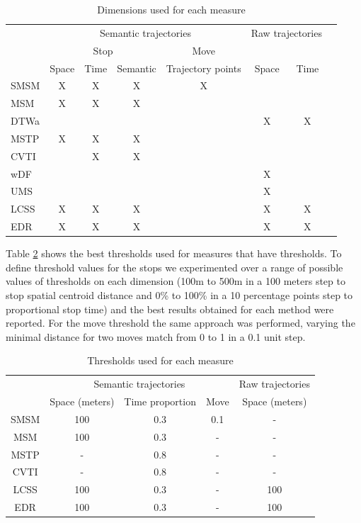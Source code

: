 \documentclass[12pt]{article}
\begin{document}
\begin{table}[!h]
\scriptsize
  \centering
  \begin{tabular}{|l|c|c|c|c|c|c|c|}
  	\hline
  & \multicolumn{4}{c|}{Semantic trajectories} & \multicolumn{2}{c|}{Raw trajectories} \\
 	\cline{2-5}
  & \multicolumn{3}{c|}{Stop} & \multicolumn{1}{c|}{Move} & \multicolumn{2}{c|}{} \\
 	\cline{2-7}
  & Space & Time & Semantic & Trajectory points & Space & Time\\
  	\hline
 SMSM & X & X & X & X & & \\
 MSM & X & X & X & & & \\
 DTWa &  &  &  & & X & X \\
 MSTP & X & X & X & & & \\
 CVTI & & X & X & & & \\
 wDF & & & & & X & \\
 UMS & & & & & X & \\
 LCSS & X & X & X & & X & X \\
 EDR & X & X & X & & X & X \\
    \hline
  \end{tabular}
  \caption{Dimensions used for each measure}
  \label{tab:san_francisco_measures}
\end{table}

Table \ref{tab:san_francisco_thresholds} shows the best thresholds used for measures that have thresholds. To define threshold values for the stops we experimented over a range of possible values of thresholds on each dimension (100m to 500m in a 100 meters step to stop spatial centroid distance and 0\% to 100\% in a 10 percentage points step to proportional stop time) and the best results obtained for each method were reported. For the move threshold the same approach was performed, varying the minimal distance for two moves match from 0 to 1 in a 0.1 unit step.

\begin{table}[!h]
\scriptsize
  \centering
  \begin{tabular}{|c|c|c|c|c|}
  	\hline
  & \multicolumn{3}{c|}{Semantic trajectories} & \multicolumn{1}{c|}{Raw trajectories} \\
 	\cline{2-5}
  & Space (meters) & Time proportion & Move & Space (meters) \\
  	\hline
 SMSM & 100 & 0.3 & 0.1 & - \\
 MSM & 100 & 0.3 & - & - \\
 MSTP & - & 0.8 & - & -  \\
 CVTI & - & 0.8 & - & -  \\
 LCSS & 100 & 0.3 & - & 100 \\
 EDR & 100 & 0.3 & - & 100 \\
    \hline
  \end{tabular}
  \caption{Thresholds used for each measure}
  \label{tab:san_francisco_thresholds}
\end{table}
\end{document}
